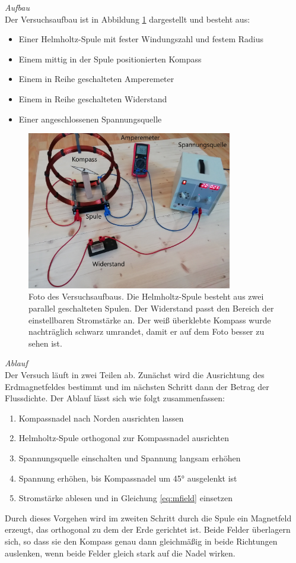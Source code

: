 \textit{Aufbau}\\
Der Versuchsaufbau ist in Abbildung \ref{img:experiment-devices} dargestellt und besteht aus: 
\begin{itemize}
	\setlength{\itemsep}{-5pt}
	\item Einer Helmholtz-Spule mit fester Windungszahl und festem Radius
	\item Einem mittig in der Spule positionierten Kompass
	\item Einem in Reihe geschalteten Amperemeter
	\item Einem in Reihe geschalteten Widerstand	
	\item Einer angeschlossenen Spannungsquelle
\end{itemize}

\begin{figure}[h!]
	\centering
	\includegraphics[width=0.8\textwidth]{images/papers/setup_labled.jpg}
	\caption{Foto des Versuchsaufbaus. Die Helmholtz-Spule besteht aus zwei parallel geschalteten Spulen. Der Widerstand passt den Bereich der einstellbaren Stromstärke an. Der weiß überklebte Kompass wurde nachträglich schwarz umrandet, damit er auf dem Foto besser zu sehen ist.}
	\label{img:experiment-devices}
\end{figure}

\textit{Ablauf}\\
Der Versuch läuft in zwei Teilen ab. Zunächst wird die Ausrichtung des Erdmagnetfeldes bestimmt und im nächsten Schritt dann der Betrag der Flussdichte. Der Ablauf lässt sich wie folgt zusammenfassen:
\begin{enumerate}
	\setlength{\itemsep}{-2pt}
	\item Kompassnadel nach Norden ausrichten lassen
	\item Helmholtz-Spule orthogonal zur Kompassnadel ausrichten
	\item Spannungsquelle einschalten und Spannung langsam erhöhen
	\item Spannung erhöhen, bis Kompassnadel um 45° ausgelenkt ist
	\item Stromstärke ablesen und in Gleichung \eqref{eq:mfield} einsetzen
\end{enumerate}

Durch dieses Vorgehen wird im zweiten Schritt durch die Spule ein Magnetfeld erzeugt, das orthogonal zu dem der Erde gerichtet ist. Beide Felder überlagern sich, so dass sie den Kompass genau dann gleichmäßig in beide Richtungen auslenken, wenn beide Felder gleich stark auf die Nadel wirken.

